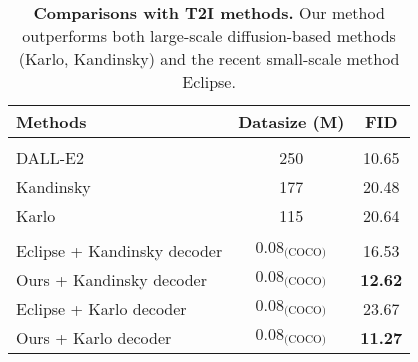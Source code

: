 \begin{table}[t]
    \centering
    \caption{\textbf{Comparisons with T2I methods.}
    Our method outperforms both large-scale diffusion-based methods (Karlo, Kandinsky) and the recent small-scale method Eclipse.}
    \label{tab.comparecoco}
    \vspace{-2mm}
    \begin{tabular}{lcc}
        \toprule
        \textbf{Methods} & \textbf{Datasize (M)} & \textbf{FID} \\
        \midrule
        \rowcolor{mColor1}
        \multicolumn{3}{l}{\textbf{Large-scale methods}} \\
        DALL-E2  & 250 & 10.65 \\
        Kandinsky & 177  & 20.48 \\
        Karlo    & 115  & 20.64 \\
        \midrule
        \rowcolor{mColor1}
        \multicolumn{3}{l}{\textbf{Small-scale alignment}} \\
        Eclipse + Kandinsky decoder    & $\text{0.08}_{\text{(COCO)}}$  & 16.53 \\
        Ours + Kandinsky decoder       & $\text{0.08}_{\text{(COCO)}}$  & \textbf{12.62} \\
        Eclipse + Karlo decoder    & $\text{0.08}_{\text{(COCO)}}$  & 23.67 \\
        Ours + Karlo decoder       & $\text{0.08}_{\text{(COCO)}}$  & \textbf{11.27} \\
        \bottomrule
    \end{tabular}
\vspace{-3mm}
\end{table}



\begin{table}[t]
\centering
\caption{
\textbf{Comparisons with Eclipse on various training data.} Our method consistently performs better.
}
\label{tab:main_results}
\vspace{-2mm}
\scriptsize
{}
\vspace{-5mm}
\end{table}





